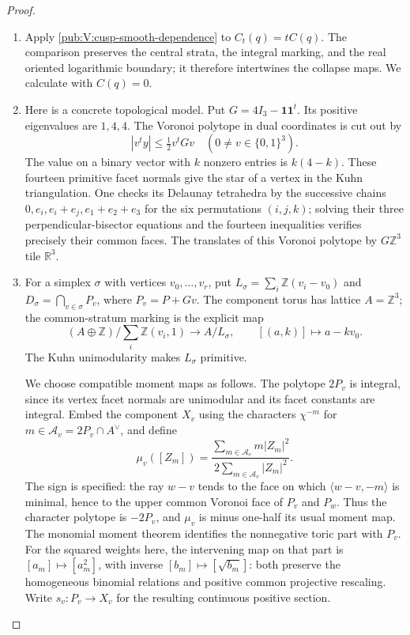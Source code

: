\documentclass[11pt,a4paper]{article}
\numberwithin{equation}{section}
\theoremstyle{definition}
\begin{document}
\begin{proof}
\begin{enumerate}[label=\arabic*.]
\item Apply \cref{pub:V:cusp-smooth-dependence} to $C_t(q)=tC(q)$.
The comparison preserves the central strata, the integral marking,
and the real oriented logarithmic boundary; it therefore intertwines
the collapse maps. We calculate with $C(q)=0$.

\item Here is a concrete topological model.  Put $G=4I_3-\mathbf1\mathbf1^t$.
Its positive eigenvalues are $1,4,4$.  The Voronoi polytope in dual
coordinates is cut out by
\[
|v^ty|\leq \tfrac12v^tGv
 \quad (0\ne v\in\{0,1\}^3).
\]
The value on a binary vector with $k$ nonzero entries is $k(4-k)$.
These fourteen primitive facet normals give the star of a vertex in
the Kuhn triangulation.  One checks its Delaunay tetrahedra by the
successive chains
$0,e_i,e_i+e_j,e_1+e_2+e_3$ for the six permutations $(i,j,k)$;
solving their three perpendicular-bisector equations and the fourteen
inequalities verifies precisely their common faces.  The translates
of this Voronoi polytope by $G\mathbb Z^3$ tile $\mathbb R^3$.

\item For a simplex $\sigma$ with vertices $v_0,\ldots,v_r$, put
$L_\sigma=\sum_i\mathbb Z(v_i-v_0)$ and
$D_\sigma=\bigcap_{v\in\sigma}P_v$, where $P_v=P+Gv$.
The component torus has lattice $A=\mathbb Z^3$; the common-stratum
marking is the explicit map
\[
 (A\oplus\mathbb Z)/\sum_i\mathbb Z(v_i,1)
 \longrightarrow A/L_\sigma,\qquad
 [(a,k)]\longmapsto a-kv_0.
\]
The Kuhn unimodularity makes $L_\sigma$ primitive.

We choose compatible moment maps as follows.  The polytope $2P_v$
is integral, since its vertex facet normals are unimodular and its
facet constants are integral.  Embed the component $X_v$ using the
characters $\chi^{-m}$ for
$m\in\mathcal A_v=2P_v\cap A^\vee$, and define
\[
 \mu_v([Z_m])=
 \frac{\sum_{m\in\mathcal A_v}m|Z_m|^2}
 {2\sum_{m\in\mathcal A_v}|Z_m|^2}.
\]
The sign is specified: the ray $w-v$ tends to the face on which
$\langle w-v,-m\rangle$ is minimal, hence to the upper common
Voronoi face of $P_v$ and $P_w$.  Thus the character polytope is
$-2P_v$, and $\mu_v$ is minus one-half its usual moment map.
The monomial moment theorem
\cite[equations (12.2.3)--(12.2.4) and Theorem 12.2.5, p.~571]{CoxLittleSchenck2011}
identifies the nonnegative toric part with $P_v$.
For the squared weights here, the intervening map on that part is
$[a_m]\mapsto[a_m^2]$, with inverse $[b_m]\mapsto[\sqrt{b_m}]$:
both preserve the homogeneous binomial relations and positive common
projective rescaling.  Write $s_v:P_v\to X_v$ for the resulting
continuous positive section.


\end{enumerate}
\end{proof}
\end{document}
